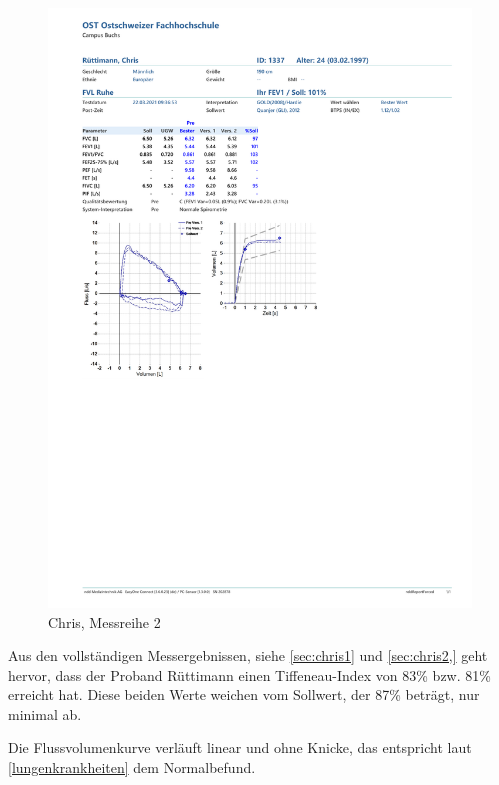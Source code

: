 \documentclass[11pt]{scrartcl}
\begin{document}
    \begin{figure}[H]
        \centering
        \includegraphics[clip, trim=1cm 10cm 0cm 11cm, width=15cm]{Dateien/Chris2.pdf}
        \caption{Chris, Messreihe 2}
    \end{figure}

    Aus den vollständigen Messergebnissen, siehe \autoref{sec:chris1} und \autoref{sec:chris2,} geht hervor, dass der
    Proband Rüttimann einen Tiffeneau-Index von 83\% bzw. 81\% erreicht hat.
    Diese beiden Werte weichen vom Sollwert, der 87\% beträgt, nur minimal ab.

    Die Flussvolumenkurve verläuft linear und ohne Knicke, das entspricht laut \autoref{lungenkrankheiten} dem
    Normalbefund.
\end{document}

